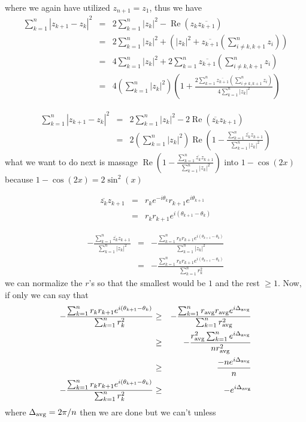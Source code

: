\documentclass[aps,preprint,preprintnumbers,nofootinbib,showpacs,prd]{revtex4-1}
\newcommand{\nbea}{\begin{eqnarray*}}
\newcommand{\neea}{\end{eqnarray*}}
\DeclareMathOperator{\re}{Re}
\begin{document}
where we again have utilized $z_{n+1} = z_1$, thus we have
%
\nbea
\sum_{k=1}^{n} \left | z_{k+1} - z_k\right |^2 & = & 2 \sum_{k=1}^{n} |z_k|^2 - \re(z_{k}\overline{z_{k+1}}) \\
& = & 2 \sum_{k=1}^{n} |z_k|^2 + \left ( |z_{k}|^2 + \overline{z_{k+1}}\left (\sum_{i\neq k,k+1}^n z_i \right ) \right ) \\
& = & 4 \sum_{k=1}^{n} |z_k|^2 + 2\sum_{k=1}^{n} \overline{z_{k+1}}\left (\sum_{i\neq k,k+1}^n z_i \right ) \\
& = & 4 \left ( \sum_{k=1}^{n} |z_k|^2 \right ) \left ( 1 + \frac{2\sum_{k=1}^{n} \overline{z_{k+1}}\left (\sum_{i\neq k,k+1}^n z_i \right )}{4 \sum_{k=1}^{n} |z_k|^2} \right )
\neea
%

%
\nbea
\sum_{k=1}^{n} \left | z_{k+1} - z_k\right |^2 & = & 2 \sum_{k=1}^{n} |z_k|^2 - 2 \re(\overline{z_{k}}z_{k+1}) \\
& = & 2 \left ( \sum_{k=1}^{n} |z_k|^2 \right )  \re \left ( 1 - \frac{\sum_{k=1}^{n} \overline{z_k}z_{k+1}}{\sum_{k=1}^{n} |z_k|^2} \right )
\neea
%
what we want to do next is massage $\re \left ( 1 - \frac{\sum_{k=1}^{n} \overline{z_k}z_{k+1}}{\sum_{k=1}^{n} |z_k|^2} \right )$ into $1 - \cos(2x)$ because $1 - \cos(2x) = 2\sin^2(x)$

%
\nbea
\overline{z_k}z_{k+1} & = & r_k e^{-i\theta_k}r_{k+1} e^{i\theta_{k+1}} \\
& = & r_k r_{k+1} e^{i(\theta_{k+1} - \theta_k)}
\neea
%

%
\nbea
-\frac{\sum_{k=1}^{n} \overline{z_k}z_{k+1}}{\sum_{k=1}^{n} |z_k|^2 } & = & -\frac{\sum_{k=1}^{n} r_k r_{k+1} e^{i(\theta_{k+1} - \theta_k)}}{\sum_{k=1}^{n} |z_k|^2} \\
& = & -\frac{\sum_{k=1}^{n} r_k r_{k+1} e^{i(\theta_{k+1} - \theta_k)}}{\sum_{k=1}^{n} r_k^2}
\neea
%
we can normalize the $r$'s so that the smallest would be $1$ and the rest $\ge 1$. Now, if only we can say that
%
\nbea
-\frac{\sum_{k=1}^{n} r_k r_{k+1} e^{i(\theta_{k+1} - \theta_k)}}{\sum_{k=1}^{n} r_k^2} & \ge & -\frac{\sum_{k=1}^{n} r_{\rm avg} r_{\rm avg} e^{i\Delta_{\rm avg}}}{\sum_{k=1}^{n} r_{\rm avg}^2} \\
& \ge & - \frac{r_{\rm avg}^2\sum_{k=1}^{n} e^{i\Delta_{\rm avg}}}{n r_{\rm avg}^2} \\
& \ge & \frac{-n e^{i\Delta_{\rm avg}}}{n } \\
-\frac{\sum_{k=1}^{n} r_k r_{k+1} e^{i(\theta_{k+1} - \theta_k)}}{\sum_{k=1}^{n} r_k^2} & \ge & - e^{i\Delta_{\rm avg}}
\neea
%
where $\Delta_{\rm avg} = 2\pi/n$ then we are done but we can't unless
\end{document}
